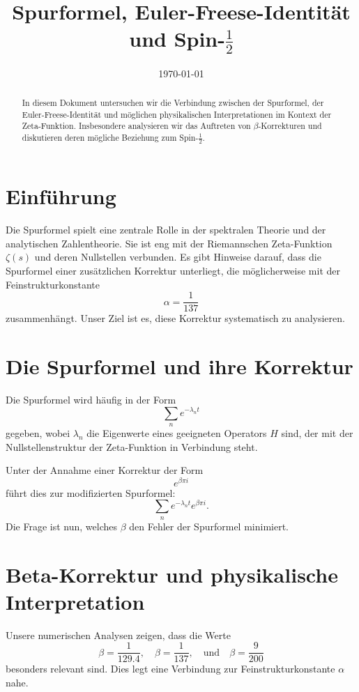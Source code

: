 \documentclass[a4paper,12pt]{article}
\title{Spurformel, Euler-Freese-Identität und Spin-\(\frac{1}{2}\)}
\author{}
\date{\today}
\begin{document}
\maketitle

\begin{abstract}
In diesem Dokument untersuchen wir die Verbindung zwischen der Spurformel, der Euler-Freese-Identität und möglichen physikalischen Interpretationen im Kontext der Zeta-Funktion. Insbesondere analysieren wir das Auftreten von \(\beta\)-Korrekturen und diskutieren deren mögliche Beziehung zum Spin-\(\frac{1}{2}\).
\end{abstract}

\section{Einführung}

Die Spurformel spielt eine zentrale Rolle in der spektralen Theorie und der analytischen Zahlentheorie. Sie ist eng mit der Riemannschen Zeta-Funktion \(\zeta(s)\) und deren Nullstellen verbunden. Es gibt Hinweise darauf, dass die Spurformel einer zusätzlichen Korrektur unterliegt, die möglicherweise mit der Feinstrukturkonstante 
\[
\alpha = \frac{1}{137}
\]
zusammenhängt. Unser Ziel ist es, diese Korrektur systematisch zu analysieren.

\section{Die Spurformel und ihre Korrektur}

Die Spurformel wird häufig in der Form
\[
\sum_{n} e^{-\lambda_n t}
\]
gegeben, wobei \(\lambda_n\) die Eigenwerte eines geeigneten Operators \(H\) sind, der mit der Nullstellenstruktur der Zeta-Funktion in Verbindung steht.

Unter der Annahme einer Korrektur der Form
\[
e^{\beta \pi i}
\]
führt dies zur modifizierten Spurformel:
\[
\sum_{n} e^{-\lambda_n t} e^{\beta \pi i}.
\]
Die Frage ist nun, welches \(\beta\) den Fehler der Spurformel minimiert.

\section{Beta-Korrektur und physikalische Interpretation}

Unsere numerischen Analysen zeigen, dass die Werte 
\[
\beta = \frac{1}{129.4}, \quad \beta = \frac{1}{137}, \quad \text{und} \quad \beta = \frac{9}{200}
\]
besonders relevant sind. Dies legt eine Verbindung zur Feinstrukturkonstante \(\alpha\) nahe.
\end{document}
